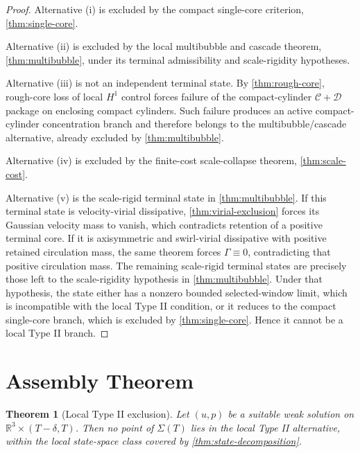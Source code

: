 \documentclass[11pt]{amsart}
\theoremstyle{plain}
\newtheorem{theorem}{Theorem}[section]
\theoremstyle{definition}
\theoremstyle{remark}
\begin{document}
\begin{proof}
Alternative \textup{(i)} is excluded by the compact single-core criterion,
\cref{thm:single-core}.

Alternative \textup{(ii)} is excluded by the local multibubble and cascade
theorem, \cref{thm:multibubble}, under its terminal admissibility and
scale-rigidity hypotheses.

Alternative \textup{(iii)} is not an independent terminal state.  By
\cref{thm:rough-core}, rough-core loss of local \(H^1\) control forces
failure of the compact-cylinder \(\mathcal C+\mathcal D\) package on enclosing
compact cylinders.  Such failure produces an active compact-cylinder
concentration branch and therefore belongs to the multibubble/cascade
alternative, already excluded by \cref{thm:multibubble}.

Alternative \textup{(iv)} is excluded by the finite-cost scale-collapse theorem,
\cref{thm:scale-cost}.

Alternative \textup{(v)} is the scale-rigid terminal state in
\cref{thm:multibubble}.  If this terminal state is velocity-virial dissipative,
\cref{thm:virial-exclusion} forces its Gaussian velocity mass to vanish, which
contradicts retention of a positive terminal core.  If it is axisymmetric and
swirl-virial dissipative with positive retained circulation mass, the same
theorem forces \(\Gamma\equiv0\), contradicting that positive circulation mass.
The remaining scale-rigid terminal states are precisely those left to the
scale-rigidity hypothesis in \cref{thm:multibubble}.  Under that hypothesis, the
state either has a nonzero bounded selected-window limit, which is incompatible
with the local Type II condition, or it reduces to the compact single-core
branch, which is excluded by \cref{thm:single-core}.  Hence it cannot be a local
Type II branch.
\end{proof}

\section{Assembly Theorem}

\begin{theorem}[Local Type II exclusion]
\label{thm:local-typeII-exclusion}
Let \((u,p)\) be a suitable weak solution on
\(\mathbb R^3\times(T-\delta,T)\).  Then no point of \(\Sigma(T)\) lies in the
local Type II alternative, within the local state-space class covered by
\cref{thm:state-decomposition}.
\end{theorem}
\end{document}
